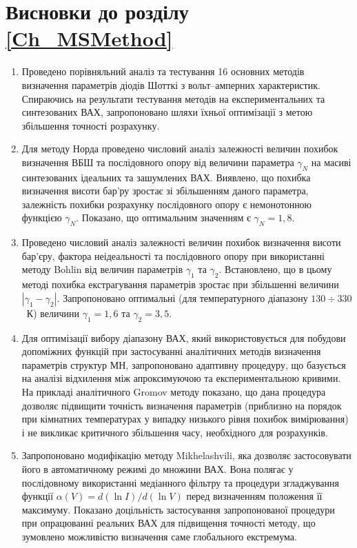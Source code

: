 \section*{Висновки до розділу \ref{Ch_MSMethod}}
  \begin{enumerate}[leftmargin=0cm,itemindent=3em]
     \item Проведено порівняльний аналіз та тестування 16 основних методів визначення параметрів діодів Шотткі з вольт--амперних характеристик.
         Спираючись на результати тестування методів на експериментальних та синтезованих  ВАХ,
         запропоновано шляхи їхньої оптимізації з метою збільшення точності розрахунку.

     \item Для методу Норда проведено числовий аналіз залежності величин похибок визначення ВБШ та послідовного опору від величини параметра $\gamma_N$ на масиві синтезованих ідеальних та зашумлених ВАХ.
     Виявлено, що похибка визначення висоти бар'ру зростає зі збільшенням даного параметра, залежність похибки розрахунку послідовного опору є немонотонною функцією $\gamma_N$.
     Показано, що оптимальним значенням є $\gamma_N=1,8$.


     \item Проведено числовий аналіз залежності величин похибок визначення висоти бар'єру, фактора неідеальності та послідовного опору при використанні методу Bohlin від величин параметрів $\gamma_1$ та $\gamma_2$.
     Встановлено, що в цьому методі похибка екстрагування параметрів зростає при збільшенні величини $|\gamma_1-\gamma_2|$.
     Запропоновано оптимальні (для температурного діапазону $130\div330$~К) величини $\gamma_1=1,6$ та $\gamma_2=3,5$.



     \item Для оптимізації вибору діапазону ВАХ, який використовується для побудови допоміжних функцій при застосуванні аналітичних методів визначення параметрів структур МН, запропоновано адаптивну процедуру, що базується на аналізі відхилення між апроксимуючою та експериментальною кривими.
         На прикладі аналітичного Gromov методу показано, що дана процедура дозволяє підвищити точність визначення параметрів (приблизно на порядок при кімнатних температурах у випадку низького рівня похибок вимірювання) і не викликає критичного збільшення часу, необхідного для розрахунків.

     \item Запропоновано модифікацію методу Mikhelashvili, яка дозволяє застосовувати його в автоматичному режимі до множини ВАХ.
     Вона полягає у послідовному використанні медіанного фільтру та процедури згладжування функції $\alpha(V)=d(\ln I)/d(\ln V)$ перед визначенням положення її максимуму.
     Показано доцільність застосування запропонованої процедури при опрацюванні реальних ВАХ для підвищення точності методу, що зумовлено можливістю визначення саме глобального екстремума.


\end{enumerate}
